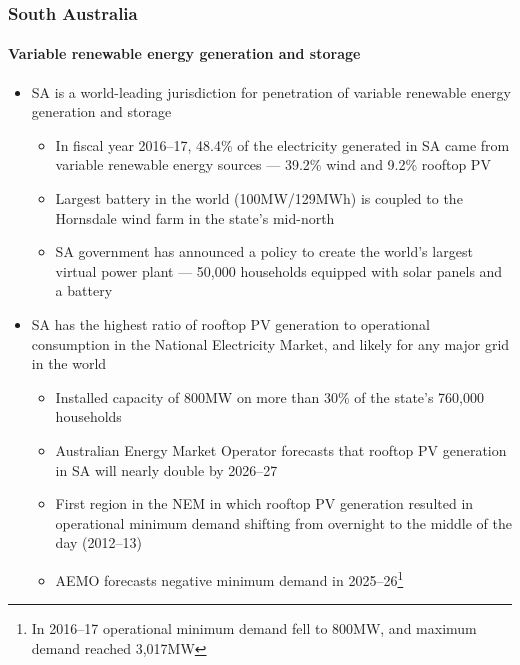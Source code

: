 \documentclass[handout, smaller, xcolor=table]{beamer}			%
\begin{document}
\begin{frame}
	\frametitle{South Australia}
	\framesubtitle{Variable renewable energy generation and storage}

	\begin{itemize}
		\item  SA is a world-leading jurisdiction for penetration of variable renewable energy generation and storage
		\begin{itemize}
			\item  In fiscal year 2016--17, 48.4\% of the electricity generated in SA came from variable renewable energy sources --- 39.2\% wind and 9.2\% rooftop PV
			\item  Largest battery in the world (100MW/129MWh) is coupled to the Hornsdale wind farm in the state's mid-north
			\item  SA government has announced a policy to create the world's largest virtual power plant --- 50,000 households equipped with solar panels and a battery
		\end{itemize}
		
		\item  SA has the highest ratio of rooftop PV generation to operational consumption in the National Electricity Market, and likely for any major grid in the world
		\begin{itemize}
			\item  Installed capacity of 800MW on more than 30\% of the state's 760,000 households
			\item  Australian Energy Market Operator forecasts that rooftop PV generation in SA will nearly double by 2026--27
			\item  First region in the NEM in which rooftop PV generation resulted in operational minimum demand shifting from overnight to the middle of the day (2012--13)
			\item  AEMO forecasts negative minimum demand in 2025--26\footnote{\scriptsize In 2016--17 operational minimum demand fell to 800MW, and maximum demand reached 3,017MW
			}
		\end{itemize}
		
	\end{itemize}

\end{frame}
\end{document}

